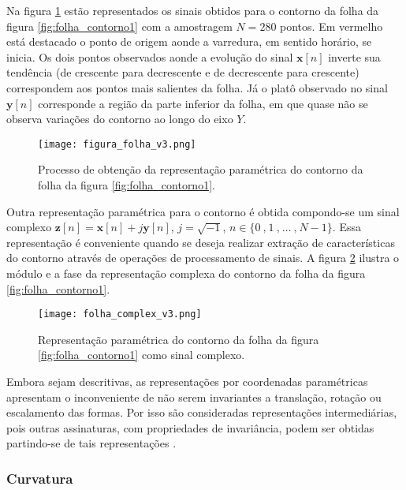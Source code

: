 Na figura \ref{fig:folha_contorno} estão representados os sinais obtidos para o contorno da folha da figura \ref{fig:folha_contorno1} com a amostragem $N = 280$ pontos. Em vermelho está destacado o ponto de origem aonde a varredura, em sentido horário, se inicia. Os dois pontos observados aonde a evolução do sinal $\mathbf{x}[n]$ inverte sua tendência (de crescente para decrescente e de decrescente para crescente) correspondem aos pontos mais salientes da folha. Já o platô observado no sinal $\mathbf{y}[n]$ corresponde a região da parte inferior da folha, em que quase não se observa variações do contorno ao longo do eixo $Y$.
   
\begin{figure} 
\caption{\label{fig:folha_contorno} Processo de obtenção da representação paramétrica do contorno da folha da figura \ref{fig:folha_contorno1}.}
\texttt{[image: figura\_folha\_v3.png]}
\end{figure}

Outra representação paramétrica para o contorno é obtida compondo-se um sinal complexo $\mathbf{z}[n] = \mathbf{x}[n] + j\mathbf{y}[n]$, $j = \sqrt{-1}$, $n \in {\{0\:\text{,}\:1\:\text{,}\:\dotsc\:\text{,}\:N-1\}}$. Essa representação é conveniente quando se deseja realizar extração de características do contorno através de operações de processamento de sinais. A figura \ref{fig:folha_complex} ilustra o módulo e a fase da representação complexa do contorno da folha da figura \ref{fig:folha_contorno1}. 

\begin{figure} 
\caption{\label{fig:folha_complex} Representação paramétrica do contorno da folha da figura \ref{fig:folha_contorno1} como sinal complexo.}
\texttt{[image: folha\_complex\_v3.png]}
\end{figure} 

Embora sejam descritivas, as representações por coordenadas paramétricas apresentam o inconveniente de não serem invariantes a translação, rotação ou escalamento das formas. Por isso são consideradas representações intermediárias, pois outras assinaturas, com propriedades de invariância, podem ser obtidas partindo-se de tais representações \cite{Kindratenko:2003}.

\subsubsection{Curvatura\label{sec:curvatura}}

